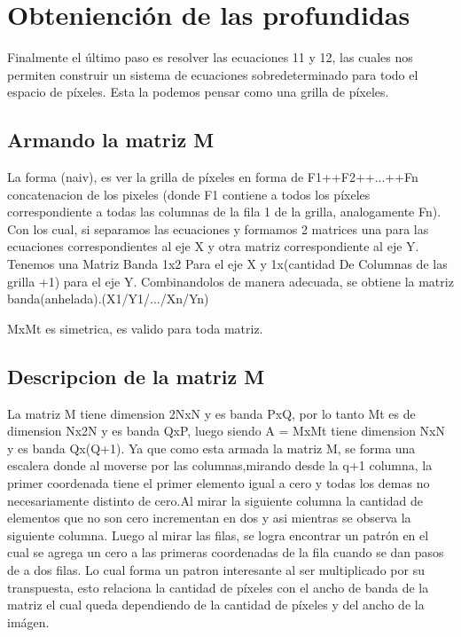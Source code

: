 \section{Obteniención de las profundidas}	

Finalmente el último paso es resolver las ecuaciones 11 y 12, las cuales nos permiten construir un sistema de ecuaciones sobredeterminado para todo el espacio de píxeles. Esta la podemos pensar como una grilla de píxeles.

\subsection{Armando la matriz M}

La forma (naiv), es ver la grilla de píxeles en forma de F1++F2++...++Fn concatenacion de los pixeles (donde F1 contiene a todos los píxeles correspondiente a todas las columnas de la fila 1 de la grilla, analogamente Fn). Con los cual, si separamos las ecuaciones y formamos 2 matrices una para las ecuaciones correspondientes al eje X y otra matriz correspondiente al eje Y. Tenemos una Matriz Banda 1x2 Para el eje X y 1x(cantidad De Columnas de las grilla +1) para el eje Y. Combinandolos de manera adecuada, se obtiene la matriz banda(anhelada).(X1/Y1/.../Xn/Yn)

MxMt es simetrica, es valido para toda matriz.

\subsection{Descripcion de la matriz M }

La matriz M tiene dimension 2NxN y es banda PxQ, por lo tanto Mt es de dimension Nx2N y es banda QxP, luego siendo A = MxMt tiene dimension NxN y es banda Qx(Q+1).
Ya que como esta armada la matriz M, se forma una escalera donde al moverse por las columnas,mirando desde la q+1 columna, la  primer coordenada tiene el primer elemento igual a cero y todas los demas no necesariamente distinto de cero.Al mirar la siguiente columna la cantidad de elementos que no son cero incrementan en dos y asi mientras se observa la siguiente columna.
Luego al mirar las filas, se logra encontrar un patrón en el cual se agrega un cero a las primeras coordenadas de la fila cuando se dan pasos de a dos filas. Lo cual forma un patron interesante al ser multiplicado por su transpuesta, esto relaciona la cantidad de píxeles con el ancho de banda de la matriz el cual queda dependiendo de la cantidad de píxeles y del ancho de la imágen.


